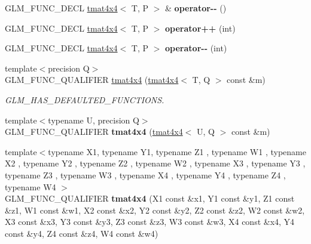 \begin{DoxyCompactItemize}
\item 
\hypertarget{structglm_1_1tmat4x4_a609557d02e1794629bca91f52f74626a}{G\-L\-M\-\_\-\-F\-U\-N\-C\-\_\-\-D\-E\-C\-L \hyperlink{structglm_1_1tmat4x4}{tmat4x4}$<$ T, P $>$ \& {\bfseries operator-\/-\/} ()}\label{structglm_1_1tmat4x4_a609557d02e1794629bca91f52f74626a}

\item 
\hypertarget{structglm_1_1tmat4x4_aa3265b4bdfd401c53ffabe57f631f1ca}{G\-L\-M\-\_\-\-F\-U\-N\-C\-\_\-\-D\-E\-C\-L \hyperlink{structglm_1_1tmat4x4}{tmat4x4}$<$ T, P $>$ {\bfseries operator++} (int)}\label{structglm_1_1tmat4x4_aa3265b4bdfd401c53ffabe57f631f1ca}

\item 
\hypertarget{structglm_1_1tmat4x4_ab1c8914e89847162b577d27d79a2b352}{G\-L\-M\-\_\-\-F\-U\-N\-C\-\_\-\-D\-E\-C\-L \hyperlink{structglm_1_1tmat4x4}{tmat4x4}$<$ T, P $>$ {\bfseries operator-\/-\/} (int)}\label{structglm_1_1tmat4x4_ab1c8914e89847162b577d27d79a2b352}

\item 
\hypertarget{structglm_1_1tmat4x4_a38fede3f5f8ca53ebc215435945572da}{{\footnotesize template$<$precision Q$>$ }\\G\-L\-M\-\_\-\-F\-U\-N\-C\-\_\-\-Q\-U\-A\-L\-I\-F\-I\-E\-R \hyperlink{structglm_1_1tmat4x4_a38fede3f5f8ca53ebc215435945572da}{tmat4x4} (\hyperlink{structglm_1_1tmat4x4}{tmat4x4}$<$ T, Q $>$ const \&m)}\label{structglm_1_1tmat4x4_a38fede3f5f8ca53ebc215435945572da}

\begin{DoxyCompactList}\small\item\em G\-L\-M\-\_\-\-H\-A\-S\-\_\-\-D\-E\-F\-A\-U\-L\-T\-E\-D\-\_\-\-F\-U\-N\-C\-T\-I\-O\-N\-S. \end{DoxyCompactList}\item 
\hypertarget{structglm_1_1tmat4x4_a58ef8d393212acb0d9a3809d1fd05fe4}{{\footnotesize template$<$typename U, precision Q$>$ }\\G\-L\-M\-\_\-\-F\-U\-N\-C\-\_\-\-Q\-U\-A\-L\-I\-F\-I\-E\-R {\bfseries tmat4x4} (\hyperlink{structglm_1_1tmat4x4}{tmat4x4}$<$ U, Q $>$ const \&m)}\label{structglm_1_1tmat4x4_a58ef8d393212acb0d9a3809d1fd05fe4}

\item 
\hypertarget{structglm_1_1tmat4x4_a55fed3aa62bbe056315198d4d7f50db4}{{\footnotesize template$<$typename X1, typename Y1, typename Z1 , typename W1 , typename X2 , typename Y2 , typename Z2 , typename W2 , typename X3 , typename Y3 , typename Z3 , typename W3 , typename X4 , typename Y4 , typename Z4 , typename W4 $>$ }\\G\-L\-M\-\_\-\-F\-U\-N\-C\-\_\-\-Q\-U\-A\-L\-I\-F\-I\-E\-R {\bfseries tmat4x4} (X1 const \&x1, Y1 const \&y1, Z1 const \&z1, W1 const \&w1, X2 const \&x2, Y2 const \&y2, Z2 const \&z2, W2 const \&w2, X3 const \&x3, Y3 const \&y3, Z3 const \&z3, W3 const \&w3, X4 const \&x4, Y4 const \&y4, Z4 const \&z4, W4 const \&w4)}\label{structglm_1_1tmat4x4_a55fed3aa62bbe056315198d4d7f50db4}


\end{DoxyCompactItemize}
